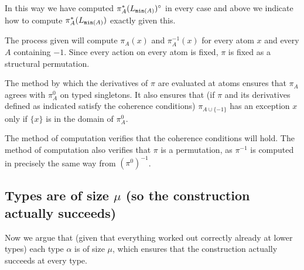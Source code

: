 \documentclass[112pt]{article}
\begin{document}
\begin{description}
In this way we have computed $\pi^*_A(L_{{\tt min}(A)})^\circ$ in every case and above we indicate how to compute $\pi^*_A(L_{{\tt min}(A)})$ exactly given this.

 The process given will compute $\pi_A(x)$ and $\pi_A^{-1}(x)$ for every atom $x$ and every $A$ containing $-1$.  Since every action on every atom is fixed, $\pi$ is fixed as a structural permutation.

The method by which the derivatives of $\pi$ are evaluated at atoms ensures that $\pi_A$ agrees with $\pi^0_A$ on typed singletons.  It also ensures that (if $\pi$ and its derivatives defined as indicated satisfy
the coherence conditions) $\pi_{A \cup \{-1\}}$ has an exception $x$ only if $\{x\}$ is in the domain of $\pi^0_A$.

The method of computation verifies that the coherence conditions will hold.  The method of computation also verifies that $\pi$ is a permutation, as $\pi^{-1}$ is computed in precisely the same way from $(\pi^0)^{-1}$.

\end{description}

\newpage
\subsection{Types are of size $\mu$ (so the construction actually succeeds)}

Now we argue that (given that everything worked out correctly already at lower types) each type $\alpha$ is of size $\mu$, which ensures
that the construction actually succeeds at every type.
\end{document}
